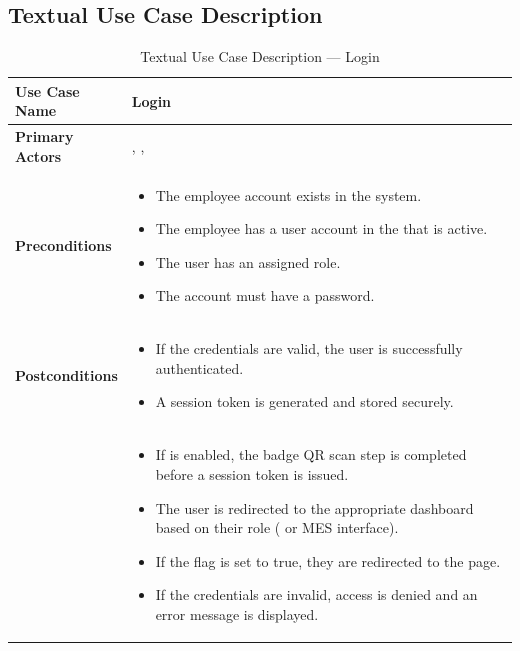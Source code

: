 \subsection{Textual Use Case Description}

\begin{longtable}{@{} P{0.22\linewidth} P{0.78\linewidth} @{}}
	\caption{Textual Use Case Description --- Login}
	\label{tab:s1-use-case-login}
	\endlastfoot
	\toprule
	\endfirsthead
	\toprule
	\endhead
	
	\bottomrule
	\endlastfoot
	
	\textbf{Use Case Name}  & Login                                                                \\
	\midrule
	\textbf{Primary Actors} & , ,  \\
	\midrule
	\textbf{Preconditions}  &                                                                      
	\begin{itemize}[nosep, leftmargin=*]
	\item The employee account exists in the  system.
	\item The employee has a user account in the  that is active.
	\item The user has an assigned role.
	\item The account must have a password.
	\end{itemize} \\
	\midrule
	
	\textbf{Postconditions} &                                                                      
	\begin{itemize}[nosep, leftmargin=*]
		\item If the credentials are valid, the user is successfully authenticated.
		\item A session token is generated and stored securely.
	\end{itemize}  \\  & 
	\begin{itemize}[nosep, leftmargin=*]
	\item If  is enabled, the badge QR scan step is completed before a session token is issued.
	\item The user is redirected to the appropriate dashboard based on their
	role ( or MES interface).
	\item If the  flag is set to true, they
	are redirected to the  page.
	\item If the credentials are invalid, access is denied and an error
	message is displayed.
	\end{itemize} \\
	\midrule
	

\end{longtable}
